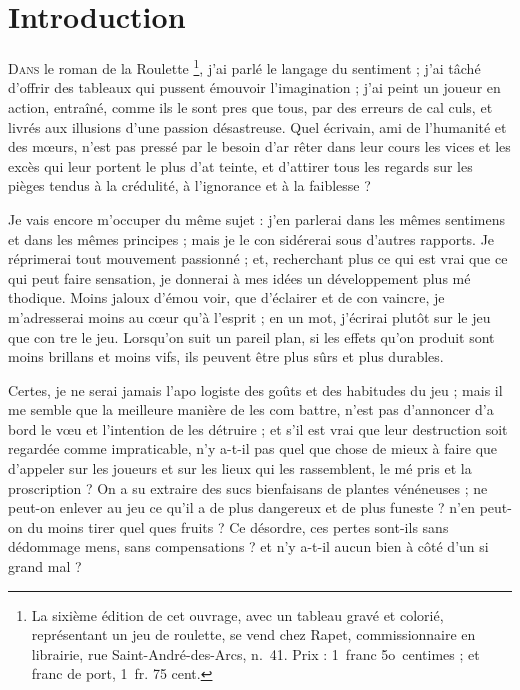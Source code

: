 \chapter{Introduction}

\lettrine{D}{ans} le roman de la Roulette
\footnote{
  La sixième édition de cet ouvrage, avec
  un tableau gravé et colorié, représentant un
  jeu de roulette, se vend chez Rapet, commissionnaire
  en librairie, rue Saint-André-des-Arcs,
  n.~41. Prix : 1~franc 5o~centimes ;  et
  franc de port, 1~fr. 75 cent.},
j'ai parlé le langage du sentiment ;
j'ai tâché d'offrir des tableaux qui
pussent émouvoir l'imagination ;
j'ai peint un joueur en action,
entraîné, comme ils le sont pres%
que tous, par des erreurs de cal%
culs, et livrés aux illusions d'une
passion désastreuse. Quel écrivain,
ami de l'humanité et des mœurs,
n'est pas pressé par le besoin d'ar%
rêter dans leur cours les vices et les
excès qui leur portent le plus d'at%
teinte, et d'attirer tous les regards
sur les pièges tendus à la crédulité,
à l'ignorance et à la faiblesse ?

Je vais encore m'occuper du
même sujet : j'en parlerai dans les
mêmes sentimens et dans les
mêmes principes ; mais je le con%
sidérerai sous d'autres rapports.
Je réprimerai tout mouvement
passionné ; et, recherchant plus
ce qui est vrai que ce qui peut
faire sensation, je donnerai à mes
idées un développement plus mé%
thodique. Moins jaloux d'émou%
voir, que d'éclairer et de con%
vaincre, je m'adresserai moins au
cœur qu'à l'esprit ; en un mot,
j'écrirai plutôt sur le jeu que con%
tre le jeu. Lorsqu'on suit un pareil
plan, si les effets qu'on produit
sont moins brillans et moins vifs,
ils peuvent être plus sûrs et plus
durables.

Certes, je ne serai jamais l'apo%
logiste des goûts et des habitudes
du jeu ; mais il me semble que la
meilleure manière de les com%
battre, n'est pas d'annoncer d'a%
bord le vœu et l'intention de les
détruire ; et s'il est vrai que leur
destruction soit regardée comme
impraticable, n'y a-t-il pas quel%
que chose de mieux à faire que
d'appeler sur les joueurs et sur les
lieux qui les rassemblent, le mé%
pris et la proscription ? On a su
extraire des sucs bienfaisans de
plantes vénéneuses ; ne peut-on
enlever au jeu ce qu'il a de plus
dangereux et de plus funeste ?
n'en peut-on du moins tirer quel%
ques fruits ? Ce désordre, ces
pertes sont-ils sans dédommage%
mens, sans compensations ? et n'y
a-t-il aucun bien à côté d'un si
grand mal ?

